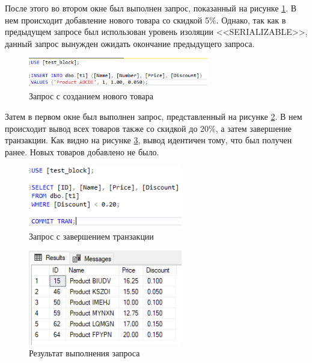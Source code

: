 \documentclass[a4paper, 14pt]{extarticle}
\begin{document}
После этого во втором окне был выполнен запрос, показанный на рисунке
\ref{fig:task-3-17}. В нем происходит добавление нового товара со скидкой 5\%.
Однако, так как в предыдущем запросе был использован уровень изоляции
<<\foreignlanguage{english}{SERIALIZABLE}>>, данный запрос вынужден ожидать
окончание предыдущего запроса.

\begin{figure}[H]
  \centering
  \includegraphics[width=0.7\textwidth]{images/task-3/17.png}
  \caption{Запрос с созданием нового товара}
  \label{fig:task-3-17}
\end{figure}

Затем в первом окне был выполнен запрос, представленный на рисунке
\ref{fig:task-3-18}. В нем происходит вывод всех товаров также со скидкой до
20\%, а затем завершение транзакции. Как видно на рисунке \ref{fig:task-3-19},
вывод идентичен тому, что был получен ранее. Новых товаров добавлено не было.

\begin{figure}[H]
  \centering
  \includegraphics[width=0.6\textwidth]{images/task-3/18.png}
  \caption{Запрос с завершением транзакции}
  \label{fig:task-3-18}
\end{figure}

\begin{figure}[H]
  \centering
  \includegraphics[width=0.6\textwidth]{images/task-3/19.png}
  \caption{Результат выполнения запроса}
  \label{fig:task-3-19}
\end{figure}
\end{document}
